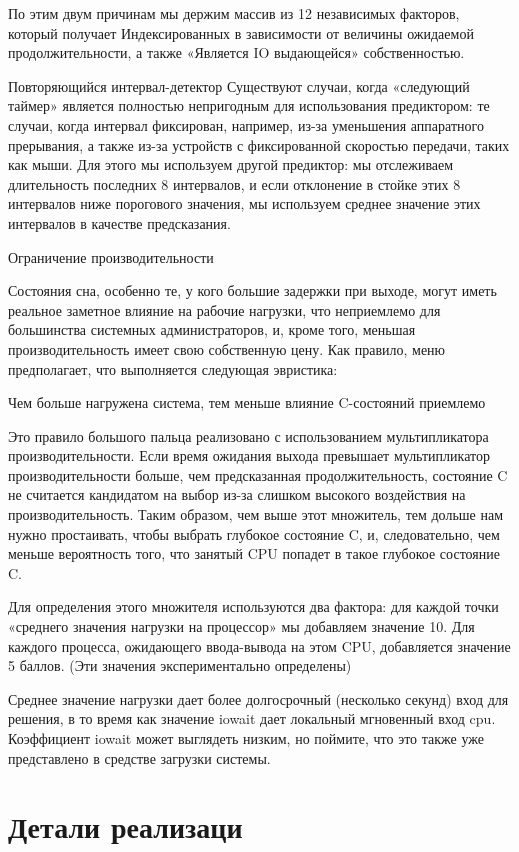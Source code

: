 \documentclass{article}
\begin{document}
По этим двум причинам мы держим массив из 12 независимых факторов, который получает
Индексированных в зависимости от величины ожидаемой продолжительности, а также
«Является IO выдающейся» собственностью.

Повторяющийся интервал-детектор
Существуют случаи, когда «следующий таймер» является полностью непригодным для использования предиктором: те случаи, когда интервал фиксирован, например, из-за уменьшения аппаратного прерывания, а также из-за устройств с фиксированной скоростью передачи, таких как мыши.
Для этого мы используем другой предиктор: мы отслеживаем длительность последних 8 интервалов, и если отклонение в стойке этих 8 интервалов ниже порогового значения, мы используем среднее значение этих интервалов в качестве предсказания.

Ограничение производительности

Состояния сна, особенно те, у кого большие задержки при выходе, могут иметь реальное заметное влияние на рабочие нагрузки, что неприемлемо для большинства системных администраторов, и, кроме того, меньшая производительность имеет свою собственную цену.
Как правило, меню предполагает, что выполняется следующая эвристика:

Чем больше нагружена система, тем меньше влияние C-состояний приемлемо

Это правило большого пальца реализовано с использованием мультипликатора производительности. Если время ожидания выхода превышает мультипликатор производительности больше, чем предсказанная продолжительность, состояние C не считается кандидатом на выбор из-за слишком высокого воздействия на производительность. Таким образом, чем выше этот множитель, тем дольше нам нужно простаивать, чтобы выбрать глубокое состояние C, и, следовательно, чем меньше вероятность того, что занятый CPU попадет в такое глубокое состояние C.

Для определения этого множителя используются два фактора: для каждой точки «среднего значения нагрузки на процессор» мы добавляем значение 10.
Для каждого процесса, ожидающего ввода-вывода на этом CPU, добавляется значение 5 баллов. (Эти значения экспериментально определены)

Среднее значение нагрузки дает более долгосрочный (несколько секунд) вход для решения, в то время как значение iowait дает локальный мгновенный вход cpu. Коэффициент iowait может выглядеть низким, но поймите, что это также уже представлено в средстве загрузки системы.


\newpage
\section{Детали реализаци}
\end{document}
